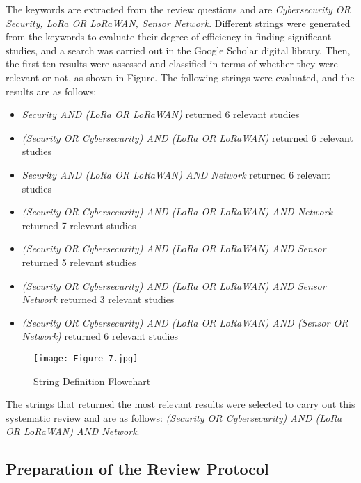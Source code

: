 \documentclass[manuscript,screen,review=false]{acmart}
\begin{document}
The keywords are extracted from the review questions and are \textit{Cybersecurity OR Security, LoRa OR LoRaWAN, Sensor Network}. Different strings were generated from the keywords to evaluate their degree of efficiency in finding significant studies, and a search was carried out in the Google Scholar digital library. Then, the first ten results were assessed and classified in terms of whether they were relevant or not, as shown in Figure. The following strings were evaluated, and the results are as follows:
\begin{itemize}
  \item \textit{Security AND (LoRa OR LoRaWAN)} returned 6 relevant studies
  \item \textit{(Security OR Cybersecurity) AND (LoRa OR LoRaWAN)} returned 6 relevant studies
  \item \textit{Security AND (LoRa OR LoRaWAN) AND Network} returned 6 relevant studies
  \item \textit{(Security OR Cybersecurity) AND (LoRa OR LoRaWAN) AND Network} returned 7 relevant studies
  \item \textit{(Security OR Cybersecurity) AND (LoRa OR LoRaWAN) AND Sensor} returned 5 relevant studies
  \item \textit{(Security OR Cybersecurity) AND (LoRa OR LoRaWAN) AND Sensor Network} returned 3 relevant studies
  \item \textit{(Security OR Cybersecurity) AND (LoRa OR LoRaWAN) AND (Sensor OR Network)} returned 6 relevant studies
\end{itemize}

\begin{figure}[h]
  \centering
  \texttt{[image: Figure\_7.jpg]}
  \caption{String Definition Flowchart}
\end{figure}

The strings that returned the most relevant results were selected to carry out this systematic review and are as follows: \textit{(Security OR Cybersecurity) AND (LoRa OR LoRaWAN) AND Network}.

\subsection{Preparation of the Review Protocol}
\end{document}
